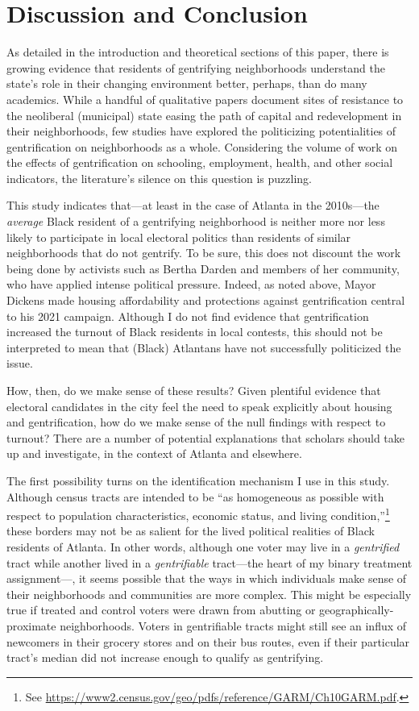 \documentclass[
  12pt,
]{article}
\begin{document}
\hypertarget{discussion-and-conclusion}{%
\section{Discussion and Conclusion}\label{discussion-and-conclusion}}

As detailed in the introduction and theoretical sections of this paper, there is growing evidence that residents of gentrifying neighborhoods understand the state's role in their changing environment better, perhaps, than do many academics. While a handful of qualitative papers document sites of resistance to the neoliberal (municipal) state easing the path of capital and redevelopment in their neighborhoods, few studies have explored the politicizing potentialities of gentrification on neighborhoods as a whole. Considering the volume of work on the effects of gentrification on schooling, employment, health, and other social indicators, the literature's silence on this question is puzzling.

This study indicates that---at least in the case of Atlanta in the 2010s---the \emph{average} Black resident of a gentrifying neighborhood is neither more nor less likely to participate in local electoral politics than residents of similar neighborhoods that do not gentrify. To be sure, this does not discount the work being done by activists such as Bertha Darden and members of her community, who have applied intense political pressure. Indeed, as noted above, Mayor Dickens made housing affordability and protections against gentrification central to his 2021 campaign. Although I do not find evidence that gentrification increased the turnout of Black residents in local contests, this should not be interpreted to mean that (Black) Atlantans have not successfully politicized the issue.

How, then, do we make sense of these results? Given plentiful evidence that electoral candidates in the city feel the need to speak explicitly about housing and gentrification, how do we make sense of the null findings with respect to turnout? There are a number of potential explanations that scholars should take up and investigate, in the context of Atlanta and elsewhere.

The first possibility turns on the identification mechanism I use in this study. Although census tracts are intended to be ``as homogeneous as possible with respect to population characteristics, economic status, and living condition,''\footnote{See \url{https://www2.census.gov/geo/pdfs/reference/GARM/Ch10GARM.pdf}.} these borders may not be as salient for the lived political realities of Black residents of Atlanta. In other words, although one voter may live in a \emph{gentrified} tract while another lived in a \emph{gentrifiable} tract---the heart of my binary treatment assignment---, it seems possible that the ways in which individuals make sense of their neighborhoods and communities are more complex. This might be especially true if treated and control voters were drawn from abutting or geographically-proximate neighborhoods. Voters in gentrifiable tracts might still see an influx of newcomers in their grocery stores and on their bus routes, even if their particular tract's median did not increase enough to qualify as gentrifying.
\end{document}

